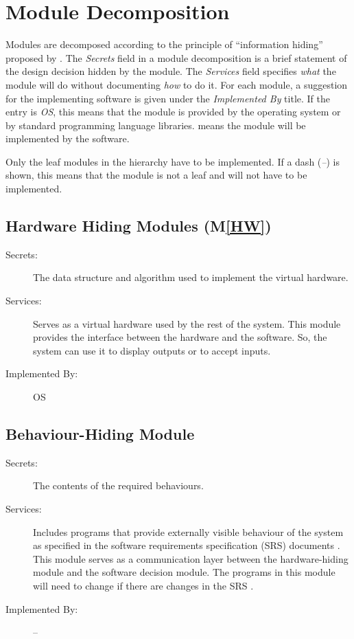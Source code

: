 \documentclass[12pt, titlepage]{article}
\newcommand{\mref}[1]{M\ref{#1}}
\begin{document}
\section{Module Decomposition} \label{SecMD}

Modules are decomposed according to the principle of ``information hiding''
proposed by \citet{ParnasEtAl1984}. The \emph{Secrets} field in a module
decomposition is a brief statement of the design decision hidden by the
module. The \emph{Services} field specifies \emph{what} the module will do
without documenting \emph{how} to do it. For each module, a suggestion for the
implementing software is given under the \emph{Implemented By} title. If the
entry is \emph{OS}, this means that the module is provided by the operating
system or by standard programming language libraries.  \emph{\progname{}} means the
module will be implemented by the \progname{} software.

Only the leaf modules in the hierarchy have to be implemented. If a dash
(\emph{--}) is shown, this means that the module is not a leaf and will not have
to be implemented.

\subsection{Hardware Hiding Modules (\mref{HW})}

\begin{description}
\item[Secrets:]The data structure and algorithm used to implement the virtual
  hardware.
\item[Services:]Serves as a virtual hardware used by the rest of the
  system. This module provides the interface between the hardware and the
  software. So, the system can use it to display outputs or to accept inputs.
\item[Implemented By:] OS
\end{description}

\subsection{Behaviour-Hiding Module}

\begin{description}
\item[Secrets:]The contents of the required behaviours.
\item[Services:]Includes programs that provide externally visible behaviour of
  the system as specified in the software requirements specification (SRS)
  documents \cite{SRS}. This module serves as a communication layer between the
  hardware-hiding module and the software decision module. The programs in this
  module will need to change if there are changes in the SRS \cite{SRS}.
\item[Implemented By:] --
\end{description}
\end{document}

